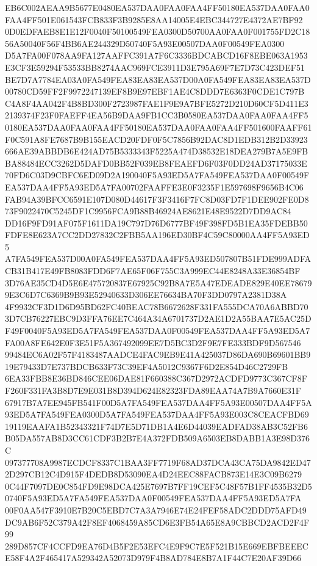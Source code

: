\documentclass[UTF8,fontset=fandol,zihao=-4,a4paper]{ctexart}
\begin{document}
{{EB6C002AEAA9B5677E0480EA537DAA0FAA0FAA4FF50180EA537DAA0FAA0FAA4FF501E061543FCB833F3B9285E8AA14005E4EBC344727E4372AE7BF92
0D0EDFAEB8E1E12F0040F50100549FEA0300D50700AA0FAA0F001755FD2C1856A50040F56F4BB6AE244329D50740F5A93E00507DAA0F00549FEA0300
D5A7FA00F078AA9FA127AAFFC391A7F6C3336BDCABCD16F8EBE063A1953E3CF3E59294F53533BB8274AAC969FCE3911D3E795A69F7E7D73C423DEF51
BE7D7A7784EA03A0FA549FEA83EA83EA537D00A0FA549FEA83EA83EA537D00780CD59FF2F9972247139EF8B9E97EBF1AE4C8DDD7E6363F0CDE1C797B
C4A8F4AA042F4B8BD300F2723987FAE1F9E9A7BFE5272D210D60CF5D411E32139374F23F0FAEFF4EA56B9DAA9FB1CC3B0580EA537DAA0FAA0FAA4FF5
0180EA537DAA0FAA0FAA4FF50180EA537DAA0FAA0FAA4FF501600FAAFF61F0C591A8FE7687B9B155EACD20FDF0F5C7856B92DAC8D1EDB312B2D33923
666AE39ABBDB6E424AD75B5333343F5225A474D38532E18DEA279B7A5E9FBBA88484ECC3262D5DAFD0BB52F039EB8FEAEFD6F03F0DD24AD37175033E
70FD6C03D9CBFC6ED09D2A190040F5A93ED5A7FA549FEA537DAA0F00549FEA537DAA4FF5A93ED5A7FA00702FAAFFE3E0F3235F1E597698F9656B4C06
FAB94A39BFCC6591E107D080D44617F3F3416F7FC8D03FD7F1DEE902FE0D873F9022470C5245DF1C9956FCA9B88B46924AE8621E48E9522D7DD9AC84
DD16F9FD91AF075F1611DA19C797D76D6777BF49F398FD5B1EA35FDEBB50FDFE8E623A7CC2DD27832C2FBB5AA196ED30BF4C59C80000AA4FF5A93ED5
A7FA549FEA537D00A0FA549FEA537DAA4FF5A93ED507807B51FDE999ADFACB31B417E49FB8083FDD6F7AE65F06F755C3A999EC44E8248A33E36854BF
3D76AE35CD4D5E6E475720837E67925C92B8A7E5A47EDEADE829E40EE786799E3C6D7C6369B9B93E52940633D306EE76634BA70F3DD0797A2381D38A
4F9932CF3D1D6D95BD62FC40BEAC78B6672628F331FA555DCA70A6ABBD703D7CB76227EBC9D3FFA76EE7C464A34A6701737D2AE1D2A55BAA7E5AC25D
F49F0040F5A93ED5A7FA549FEA537DAA0F00549FEA537DAA4FF5A93ED5A7FA00A8FE642E0F3E51F5A367492099EE7D5BC3D2F9E7FE333BDF9D567546
99484EC6A02F57F4183487AADCE4FAC9EB9E41A425037D86DA690B69601BB919E79433D7E737BDCB633F73C39EF4A5012C9367F6D2E854D46C2729FB
6EA33FBB8E36BD846CEE06DAE81F660388C367D2972ACDFD9773C367CF8FF260F331FA3B8D7E9E031B8D394D624E82323FDA89EAA74A7B9A7660E31F
67917B7A7EE945FB541F00D5A7FA549FEA537DAA4FF5A93E00507DAA4FF5A93ED5A7FA549FEA0300D5A7FA549FEA537DAA4FF5A93E003C8CEACFBD69
19119EAAFA1B52343321F74D7E5D71DB1A4E6D44039EADFAD38AB3C52FB6B05DA557AB8D3CC61CDF3B2B7E4A372FDB509A6503EB8DABB1A3E98D376C
097377708A9987ECDCF8337C1BAA3FF7719F68AD37DCA43CA75DA9842ED472D297CB12C4D915F4DEDB8D53090EA4D24EEC88FACB873E14E3C09B6279
0C44F7097DE0C854FD9E98DCA425E7697B7FF19CEF5C48F57B1FF4535B32D50740F5A93ED5A7FA549FEA537DAA0F00549FEA537DAA4FF5A93ED5A7FA
00F0AA547F3910E7B20C5EBD7C7A3A7946E74E24FEF58ADC2DDD75AFD49DC9AB6F52C379A42F8EF4068459A85CD6E3FB54A65E8A9CBBCD2ACD2F4F99
289D857CF4CCFD9EA76D4B5F2E53EFC4E9F9C7E5F521B15E669EBFBEEECE58F4A2F465417A529342A52073D979F4B8AD784E8B7A1F44C7E20AF39D66
}}
\end{document}
